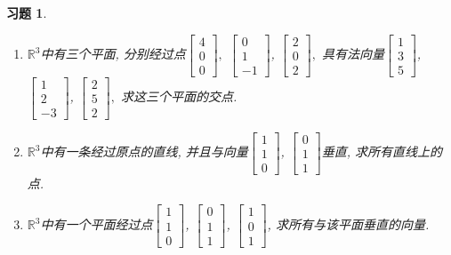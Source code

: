\documentclass[UTF8]{ctexart}
\newtheorem{ex}[thm]{习题}
\begin{document}
\begin{ex}
\begin{enumerate}
\item $\mathbb{R}^3$中有三个平面, 分别经过点$\begin{bmatrix}
				4 \\  0\\  0
			\end{bmatrix},$ $\begin{bmatrix}
				0 \\  1\\  -1
			\end{bmatrix}$, $\begin{bmatrix}
				2 \\  0\\  2
			\end{bmatrix},$ 具有法向量$\begin{bmatrix}
				1 \\  3\\  5
			\end{bmatrix}$, $\begin{bmatrix}
				1 \\  2\\  -3
			\end{bmatrix}$, $\begin{bmatrix}
				2 \\  5\\  2
			\end{bmatrix},$ 求这三个平面的交点.

\item $\mathbb{R}^3$中有一条经过原点的直线, 并且与向量$\begin{bmatrix}
				1 \\  1\\  0
			\end{bmatrix}$, $\begin{bmatrix}
				0 \\  1\\  1
			\end{bmatrix}$垂直, 求所有直线上的点.

\item $\mathbb{R}^3$中有一个平面经过点$\begin{bmatrix}
				1 \\  1\\  0
			\end{bmatrix}$, $\begin{bmatrix}
				0 \\  1\\  1
			\end{bmatrix}$, $\begin{bmatrix}
				1 \\  0\\  1
			\end{bmatrix}$, 求所有与该平面垂直的向量.
\end{enumerate}
\end{ex}
\end{document}
